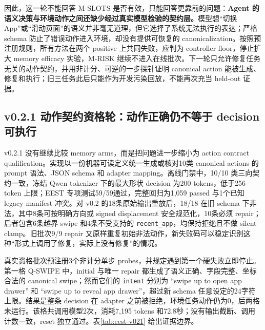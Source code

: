 \documentclass[12pt,a4paper]{ctexart}
\begin{document}
因此，这一轮不能回答 M-SLOTS 是否有效，只能回答更靠前的问题：\textbf{Agent 的语义决策与环境动作之间还缺少经过真实模型检验的契约层。}模型想“切换 App”或“滑动页面”的语义并非毫无道理，但它选择了系统无法执行的表达；严格 schema 防止了错误动作进入环境，却没有提供可恢复的 canonicalization。按照预注册规则，所有方法在两个 positive 上共同失败，应判为 controller floor，停止扩大 memory efficacy 实验，M-RISK 继续不进入在线批次。下一轮只允许修复任务无关的动作契约，并用非计分、可逆的一步探针证明 canonical action 能被生成、修复和执行；旧三任务此后只能作为开发污染回放，不能再次充当 held-out 证据。

\subsection{v0.2.1 动作契约资格轮：动作正确仍不等于 decision 可执行}

v0.2.1 没有继续比较 memory arms，而是把问题进一步缩小为 action contract qualification。实现以一份机器可读定义统一生成或核对10类 canonical actions 的 prompt 语法、JSON schema 和 adapter mapping。离线门禁中，10/10 类三向契约一致，冻结 Qwen tokenizer 下的最大形状 decision 为200 tokens，低于256-token 上限；EEST 专项测试59/59通过，完整回归为1,059 passed 与1个已知 legacy manifest 冲突。对 v0.2 的18条原始输出重放后，18/18 在旧 schema 下非法，其中8条可按明确方向或 signed displacement 安全规范化，10条必须 repair；后者包含6条越界 swipe 和4条不受支持的 \texttt{recent\_app}，均保持拒绝且不做 silent clamp。旧批次9/9 repair 又原样重复初始非法动作，新失败码可以稳定识别这种“形式上调用了修复，实际上没有修复”的情况。

真实资格批次预注册3个非计分单步 probes，并规定遇到第一个硬失败立即停止。第一格 Q-SWIPE 中，initial 与唯一 repair 都生成了语义正确、字段完整、坐标合法的 canonical swipe；然而它们的 \texttt{intent} 分别为 ``swipe up to open app drawer'' 和 ``swipe up to reveal app drawer''，超过新 schema 任意设定的24字符上限。结果是整条 decision 在 adapter 之前被拒绝，环境任务动作仍为0，后两格未运行。该格共调用模型2次，消耗7,195 tokens 和72.8秒；没有输出截断、调用计数一致，reset 独立通过。表\ref{tab:eest-v021} 给出证据边界。
\end{document}
